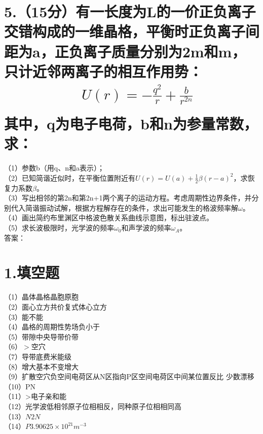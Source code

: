 \documentclass[UTF8]{ctexart}
\begin{document}
\section*{5.（15分）有一长度为L的一价正负离子交错构成的一维晶格，平衡时正负离子间距为a，正负离子质量分别为2m和m，只计近邻两离子的相互作用势：
\begin{equation*}
    \begin{aligned}
        & U(r)=-\frac{q^2}{r}+\frac{b}{r^{2n}}\\
    \end{aligned}
\end{equation*}
其中，q为电子电荷，b和n为参量常数，求：}
（1）参数b（用q、n和a表示）；\\
（2）已知简谐近似时，在平衡位置附近有$U(r)=U(a)+\frac{1}{2}\beta(r-a)^2$，求恢复力系数$\beta$。\\
（3）写出相邻的第2n和第2n+1两个离子的运动方程。考虑周期性边界条件，并分别代入简谐振动试解，根据方程解存在的条件，求出可能发生的格波频率解$\omega$。\\
（4）画出简约布里渊区中格波色散关系曲线示意图，标出驻波点。\\
（5）求长波极限时，光学波的频率$\omega_0$和声学波的频率$\omega_A$。\\


答案：\\
\section*{1.填空题}
（1）晶体晶格晶胞原胞\\
（2）面心立方共价复式体心立方\\
（3）能不能\\
（4）晶格的周期性势场负小于\\
（5）带隙中央导带价带\\
（6）$>$空穴\\
（7）导带底费米能级\\
（8）增大基本不变增大\\
（9）扩散空穴负空间电荷区从N区指向P区空间电荷区中间某位置反比
少数漂移\\
（10）PN\\
（11）>电子亲和能\\
（12）光学波低相邻原子位相相反，同种原子位相相同高\\
（13）$N$$2N$\\
（14）$P$$3.90625\times10^{21}m^{-3}$\\
\end{document}
